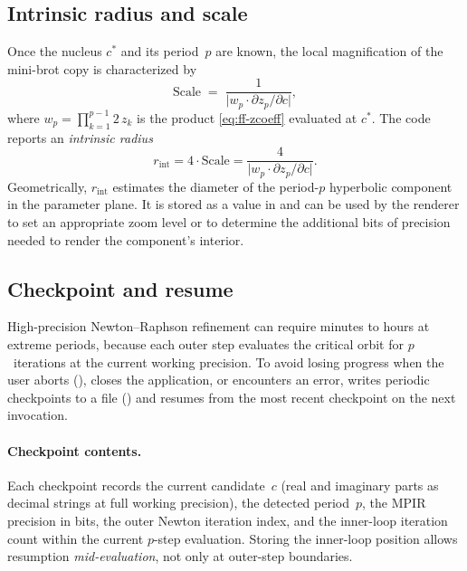 \subsection{Intrinsic radius and scale}
\label{subsec:ff-intrinsic-radius}

Once the nucleus $c^*$ and its period~$p$ are known, the local magnification
of the mini-brot copy is characterized by
\begin{equation}\label{eq:ff-scale}
\mathrm{Scale} \;=\;
  \frac{1}{\bigl|w_p \cdot \partial z_p/\partial c\bigr|},
\end{equation}
where $w_p = \prod_{k=1}^{p-1} 2\,z_k$ is the  product
\eqref{eq:ff-zcoeff} evaluated at $c^*$. The code reports an \emph{intrinsic radius}
\begin{equation}\label{eq:ff-intrinsic-radius}
r_{\mathrm{int}} = 4 \cdot \mathrm{Scale}
  = \frac{4}{\bigl|w_p \cdot \partial z_p/\partial c\bigr|}.
\end{equation}
Geometrically, $r_{\mathrm{int}}$ estimates the diameter of the
period-$p$ hyperbolic component in the parameter plane.  It is stored
as a  value in  and can be used by
the renderer to set an appropriate zoom level or to determine the additional
bits of precision needed to render the component's interior.

\subsection{Checkpoint and resume}
\label{subsec:ff-checkpoint}

High-precision Newton--Raphson refinement can require minutes to hours
at extreme periods, because each outer step evaluates the critical orbit
for $p$~iterations at the current working precision.  To avoid losing
progress when the user aborts (), closes the
application, or encounters an error, \FractalShark{} writes periodic
checkpoints to a file () and resumes from the
most recent checkpoint on the next invocation.

\paragraph{Checkpoint contents.}
Each checkpoint records the current candidate~$c$ (real and imaginary
parts as decimal strings at full working precision), the detected
period~$p$, the MPIR precision in bits, the outer Newton iteration
index, and the inner-loop iteration count within the current $p$-step
evaluation.  Storing the inner-loop position allows resumption
\emph{mid-evaluation}, not only at outer-step boundaries.

